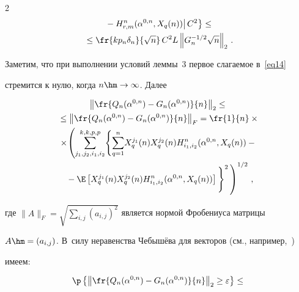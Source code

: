 \begin{multicols}{2}
\begin{multline}
\left.\left.{}-


H^n_{r,m}(\alpha^{0,n}, X_q(n))\right|C^2\right\}\leq{}\\


{}\leq\fr{kp_n\delta_n}{\sqrt{n}} \,C^2L\left\|G_n^{-1/2}\sqrt{n}\right\|_2\,.


\label{eq161}


\end{multline}





Заметим, что при выполнении условий леммы~3 первое слагаемое в~\eqref{eq14} 


стремится к нулю, когда $n\hm\rightarrow\infty$. Далее


\begin{multline*}


\left\|\fr{Q_n(\alpha^{0,n})-G_n(\alpha^{0,n})}{n}\right\|_2\leq{}\\


{}\leq


\left\|\fr{Q_n(\alpha^{0,n})-G_n(\alpha^{0,n})}{n}\right\|_{F}=\fr{1}{n}\times{}\\


{}\times\!\left(\sum\limits_{j_1,j_2,i_1,i_2}^{k,k,p,p}\!\left\{


\sum\limits_{q=1}^n\!X_q^{j_1}(n)X_q^{j_2}(n)H^n_{i_1,i_2}(\alpha^{0,n}, X_q(n))-{}\right.\right.\\


\left.\left.{}-\E\left[X_q^{j_1}(n)X_q^{j_2}(n)H_{i_1,i_2}^n(\alpha^{0,n}, X_q(n))\right]


\vphantom{\sum\limits_{q=1}^n}


\right\}^2


\vphantom{\sum\limits_{j_1,j_2,i_1,i_2}^{k,k,p,p}}\right)^{1/2}\,,


\end{multline*}


где $\|A\|_F=\sqrt{\sum\limits_{i,j}(a_{i,j})^2}$ является нормой Фробениуса матрицы 


$A\hm=(a_{i,j})$. В~силу неравенства Чебышёва для векторов (см., например,~\cite{vectors}) 


имеем:


\begin{multline*}


\p\left\{\left\|\fr{Q_n(\alpha^{0,n})-G_n(\alpha^{0,n})}{n}\right\|_2\geq


\varepsilon\right\}\leq{}\\



\end{multline*}
\end{multicols}
